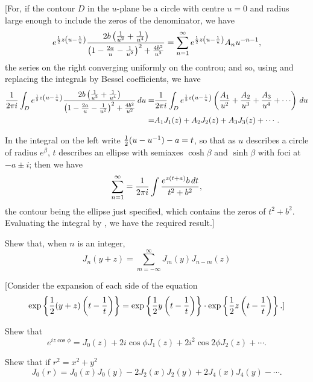 \documentclass{book}
\begin{document}
[For, if the contour $D$ in the $u$-plane be a circle with centre
$u=0$ and radius large enough to include the zeros of the denominator,
we have
$$
e^{\frac{1}{2} z \left( u - \frac{1}{u} \right)} 
\frac{ 2b \left( \frac{1}{u^2} + \frac{1}{u^4}  \right)  }{ \left( 1 -
    \frac{2a}{u} - \frac{1}{u^2} \right)^2
  + \frac{4 b^2}{u^2}  }
=
\sum_{n=1}^{\infty}
e^{\frac{1}{2} z \left( u - \frac{1}{u} \right)} A_n u^{-n-1},
$$
the series on the right converging uniformly on the controu; and so, 
using  and replacing the integrals by Bessel
coefficients, we have
\begin{align*}
  \frac{1}{2\pi i}
  \int_D
  e^{\half z \theparen{u - \frac{1}{u}}}
  \frac{ 2b \theparen{\frac{1}{u^2} + \frac{1}{u^4} }  }{ \theparen{1 -
      \frac{2a}{u} - \frac{1}{u^2}}^2
    + \frac{4 b^2}{u^2}  }
  \dmeasure u
  =& \frac{1}{2\pi i}
  \int_D
  e^{\half z \theparen{u - \frac{1}{u}}}
  \theparen{ \frac{A_1}{u^2} + \frac{A_2}{u^3} + \frac{A_3}{u^4} +
    \cdots  }
  \dmeasure u \\
  =& A_1 J_1(z) + A_2 J_2(z) + A_3 J_3(z) + \cdots .
\end{align*}

%
%
In the integral on the left write $\frac{1}{2} (u - u^{-1}) - a = t$, so that as
$u$ describes a circle of radius $e^{\beta}$, $t$ describes an ellipse
with 
semiaxes $\cosh\beta$ and $\sinh\beta$ with foci at 
$-a \pm i$; then we have
$$
\sum_{n=1}^{\infty}
=
\frac{1}{2\pi i}
\int
\frac{ e^{z(t+a)}b \, d t  }{ t^2 + b^2  },
$$
the contour being the ellipse just specified, which contains the zeros
of $t^2 + b^2$. Evaluating the integral by 
, we have the required result.]
\begin{wandwexample}
  Shew that, when $n$ is an integer,
  $$
  J_n(y+z)
  =
  \sum_{m = -\infty}^{\infty} J_{m}(y) J_{n-m}(z)
  $$
\end{wandwexample}
[Consider the expansion of each side of the equation
$$
\exp \left\{  \frac{1}{2} (y+z) \left( t - \frac{1}{t} \right)   \right\}
=
\exp \left\{  \frac{1}{2} y \left( t - \frac{1}{t} \right)   \right\}
\cdot
\exp \left\{  \frac{1}{2} z \left( t - \frac{1}{t} \right)   \right\}.]
$$
\begin{wandwexample}
  Shew that 
$$
e^{i z \cos \phi}
= 
J_0(z)
+ 2 i \cos\phi J_1(z)
+ 2 i^2 \cos 2\phi J_2(z)
+ \cdots.
$$
\end{wandwexample}
\begin{wandwexample}
  Shew that if $r^2 = x^2 + y^2$
  $$
  J_0(r)
  =
  J_0(x)J_0(y)
  - 2 J_2(x) J_2(y)
  + 2 J_4(x) J_4(y)
  - \cdots .
  $$
\end{wandwexample}
\end{document}
